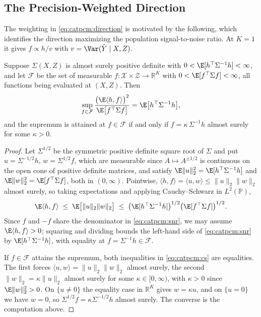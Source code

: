 \documentclass[twoside,11pt]{article}
\begin{document}
\subsection{The Precision-Weighted Direction}
\label{app:catpcm:optimal}

The weighting in \eqref{eq:catpcm:direction} is motivated by the following, which identifies the direction maximizing the population signal-to-noise ratio. At $K = 1$ it gives $f \propto h/v$ with $v = \Var(\tilde{Y} \mid X, Z)$.

\begin{proposition}
  \label{prop:catpcm}
  Suppose $\Sigma(X,Z)$ is almost surely positive definite with $0 < \E[h^{\top}\Sigma^{-1}h] < \infty$, and let $\mathcal{F}$ be the set of measurable $f : \mathcal{X} \times \mathcal{Z} \to \mathbb{R}^K$ with $0 < \E[f^{\top}\Sigma f] < \infty$, all functions being evaluated at $(X,Z)$. Then
  \begin{equation}
    \label{eq:catpcm:snr}
    \sup_{f \in \mathcal{F}} \frac{\bigl(\E\langle h, f\rangle\bigr)^2}{\E\bigl[f^{\top}\Sigma f\bigr]} = \E\bigl[h^{\top}\Sigma^{-1}h\bigr],
  \end{equation}
  and the supremum is attained at $f \in \mathcal{F}$ if and only if $f = \kappa\,\Sigma^{-1}h$ almost surely for some $\kappa > 0$.
\end{proposition}

\begin{proof}
  Let $\Sigma^{1/2}$ be the symmetric positive definite square root of $\Sigma$ and put $u = \Sigma^{-1/2}h$, $w = \Sigma^{1/2}f$, which are measurable since $A \mapsto A^{\pm 1/2}$ is continuous on the open cone of positive definite matrices, and satisfy $\E\lVert u \rVert_2^2 = \E[h^{\top}\Sigma^{-1}h]$ and $\E\lVert w \rVert_2^2 = \E[f^{\top}\Sigma f]$, both in $(0,\infty)$. Pointwise, $\langle h, f \rangle = \langle u, w \rangle \leq \lVert u \rVert_2 \lVert w \rVert_2$ almost surely, so taking expectations and applying Cauchy--Schwarz in $L^2(\mathbb{P})$,
  \begin{equation}
    \label{eq:catpcm:cs}
    \E\langle h, f \rangle \;\leq\; \E\bigl[\lVert u \rVert_2 \lVert w \rVert_2\bigr] \;\leq\; \bigl(\E[h^{\top}\Sigma^{-1}h]\bigr)^{1/2}\bigl(\E[f^{\top}\Sigma f]\bigr)^{1/2}.
  \end{equation}
  Since $f$ and $-f$ share the denominator in \eqref{eq:catpcm:snr}, we may assume $\E\langle h, f\rangle > 0$; squaring and dividing bounds the left-hand side of \eqref{eq:catpcm:snr} by $\E[h^{\top}\Sigma^{-1}h]$, with equality at $f = \Sigma^{-1}h \in \mathcal{F}$.

  If $f \in \mathcal{F}$ attains the supremum, both inequalities in \eqref{eq:catpcm:cs} are equalities. The first forces $\langle u, w \rangle = \lVert u \rVert_2 \lVert w \rVert_2$ almost surely, the second $\lVert w \rVert_2 = \kappa \lVert u \rVert_2$ almost surely for some $\kappa \in [0,\infty)$, with $\kappa > 0$ since $\E\lVert w \rVert_2^2 > 0$. On $\{u \neq 0\}$ the equality case in $\mathbb{R}^K$ gives $w = \kappa u$, and on $\{u = 0\}$ we have $w = 0$, so $\Sigma^{1/2} f = \kappa \Sigma^{-1/2} h$ almost surely. The converse is the computation above.
\end{proof}
\end{document}
